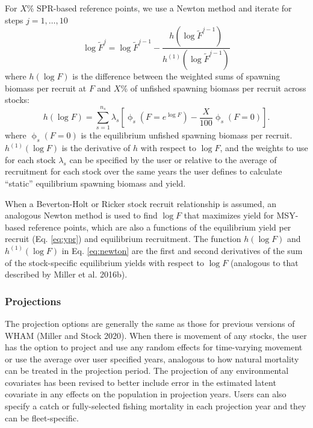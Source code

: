 \documentclass[
]{article}
\begin{document}
For \(X\%\) SPR-based reference points, we use a Newton method and iterate for steps \(j = 1,\ldots,10\)
\begin{equation}\label{eq:newton}
  \log\widetilde{F}^{j} = \log\widetilde{F}^{j-1} - \frac{h\left(\log\widetilde{F}^{j-1}\right)}{h^{(1)}\left(\log\widetilde{F}^{j-1}\right)}
\end{equation}
where \(h(\log F)\) is the difference between the weighted sums of spawning biomass per recruit at \(F\) and \(X\)\% of unfished spawning biomass per recruit across stocks:
\begin{equation}\label{eq:newton-obj}
  h(\log F) = \sum^{n_s}_{s=1} \lambda_s\left[\upphi_s\left(F = e^{\log F}\right) - \frac{X}{100}\upphi_s\left(F=0\right)\right].
\end{equation}
where \(\upphi_s\left(F=0\right)\) is the equilibrium unfished spawning biomass per recruit. \(h^{(1)}(\log F)\) is the derivative of \(h\) with respect to \(\log F\), and the weights to use for each stock \(\lambda_s\) can be specified by the user or relative to the average of recruitment for each stock over the same years the user defines to calculate ``static'' equilibrium spawning biomass and yield.

When a Beverton-Holt or Ricker stock recruit relationship is assumed, an analogous Newton method is used to find \(\log F\) that maximizes yield for MSY-based reference points, which are also a functions of the equilibrium yield per recruit (Eq. \ref{eq:ypr}) and equilibrium recruitment. The function \(h(\log F)\) and \(h^{(1)}(\log F)\) in Eq. \ref{eq:newton} are the first and second derivatives of the sum of the stock-specific equilibrium yields with respect to \(\log F\) (analogous to that described by Miller et al. 2016b).

\hypertarget{projections}{%
\subsubsection*{Projections}\label{projections}}

The projection options are generally the same as those for previous versions of WHAM (Miller and Stock 2020). When there is movement of any stocks, the user has the option to project and use any random effects for time-varying movement or use the average over user specified years, analogous to how natural mortality can be treated in the projection period. The projection of any environmental covariates has been revised to better include error in the estimated latent covariate in any effects on the population in projection years. Users can also specify a catch or fully-selected fishing mortality in each projection year and they can be fleet-specific.
\end{document}
